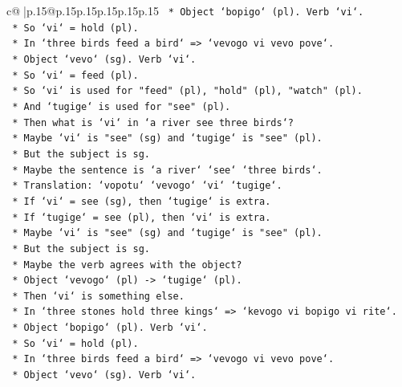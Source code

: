 \documentclass{article}
\begin{document}
{\begin{supertabular}{c@{$\;$}|p{.15\linewidth}@{}p{.15\linewidth}p{.15\linewidth}p{.15\linewidth}p{.15\linewidth}p{.15\linewidth}}
{{{\texttt{                *   Object `bopigo` (pl). Verb `vi`.} \\
\texttt{                *   So `vi` = hold (pl).} \\
\texttt{                *   In `three birds feed a bird` => `vevogo vi vevo pove`.} \\
\texttt{                *   Object `vevo` (sg). Verb `vi`.} \\
\texttt{                *   So `vi` = feed (pl).} \\
\texttt{                *   So `vi` is used for "feed" (pl), "hold" (pl), "watch" (pl).} \\
\texttt{                *   And `tugige` is used for "see" (pl).} \\
\texttt{                *   Then what is `vi` in `a river see three birds`?} \\
\texttt{                *   Maybe `vi` is "see" (sg) and `tugige` is "see" (pl).} \\
\texttt{                *   But the subject is sg.} \\
\texttt{                *   Maybe the sentence is `a river` `see` `three birds`.} \\
\texttt{                *   Translation: `vopotu` `vevogo` `vi` `tugige`.} \\
\texttt{                *   If `vi` = see (sg), then `tugige` is extra.} \\
\texttt{                *   If `tugige` = see (pl), then `vi` is extra.} \\
\texttt{                *   Maybe `vi` is "see" (sg) and `tugige` is "see" (pl).} \\
\texttt{                *   But the subject is sg.} \\
\texttt{                *   Maybe the verb agrees with the object?} \\
\texttt{                *   Object `vevogo` (pl) {-}> `tugige` (pl).} \\
\texttt{                *   Then `vi` is something else.} \\
\texttt{                *   In `three stones hold three kings` => `kevogo vi bopigo vi rite`.} \\
\texttt{                *   Object `bopigo` (pl). Verb `vi`.} \\
\texttt{                *   So `vi` = hold (pl).} \\
\texttt{                *   In `three birds feed a bird` => `vevogo vi vevo pove`.} \\
\texttt{                *   Object `vevo` (sg). Verb `vi`.} \\
}}}
\end{supertabular}}
\end{document}
